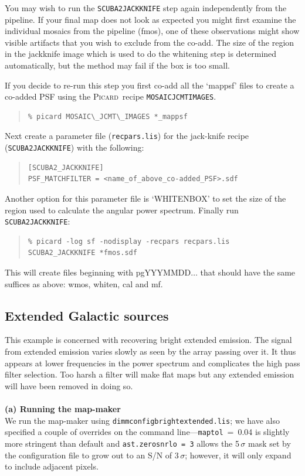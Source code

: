 \documentclass[twoside,11pt]{article}
\newcommand{\xref}[3]{#1}
\newcommand{\xlabel}[1]{}
\renewcommand{\_}{\texttt{\symbol{95}}}
\newenvironment{myquote}{\begin{quote}\begin{small}}{\end{small}\end{quote}}
\newcommand{\picard}{\xref{\textsc{Picard}}{sun265}{}}
\newcommand{\drrecipe}[1]{\texttt{#1}}
\begin{document}
You may wish to run the \drrecipe{SCUBA2\_JACKKNIFE} step again
independently from the pipeline. If your final map does not look as
expected you might first examine the individual mosaics from the
pipeline (\_fmos), one of these observations might show visible
artifacts that you wish to exclude from the co-add. The size of the
region in the jackknife image which is used to do the whitening step
is determined automatically, but the method may fail if the box is too
small.

If you decide to re-run this step you first co-add all the `\_mappsf'
files to create a co-added PSF using the \picard\ recipe
\xref{\drrecipe{MOSAIC\_JCMT\_IMAGES}}{sun265}{MOSAIC_JCMT_IMAGES}.
\begin{myquote}
\begin{verbatim}
% picard MOSAIC\_JCMT\_IMAGES *_mappsf
\end{verbatim}
\end{myquote}
Next create a parameter file (\texttt{recpars.lis}) for the jack-knife
recipe (\drrecipe{SCUBA2\_JACKKNIFE}) with the following:
\begin{myquote}
\begin{verbatim}
[SCUBA2_JACKKNIFE]
PSF_MATCHFILTER = <name_of_above_co-added_PSF>.sdf
\end{verbatim}
\end{myquote}
Another option for this parameter file is `WHITEN\_BOX' to set the
size of the region used to calculate the angular power spectrum.
Finally run \drrecipe{SCUBA2\_JACKKNIFE}:
\begin{myquote}
\begin{verbatim}
% picard -log sf -nodisplay -recpars recpars.lis SCUBA2_JACKKNIFE *fmos.sdf
\end{verbatim}
\end{myquote}
This will create files beginning with pgYYYMMDD$\ldots$ that should have
the same suffices as above: \_wmos, \_whiten, \_cal and \_mf.


\subsection{\xlabel{Galactic}Extended Galactic sources}
\label{sec:bright_ex}

This example is concerned with recovering bright extended emission.
The signal from extended emission varies slowly as seen by the array
passing over it. It thus appears at lower frequencies in the power
spectrum and complicates the high pass filter selection. Too harsh a
filter will make flat maps but any extended emission will have been
removed in doing so.
\\ \\
\textbf{(a) Running the map-maker}\\
We run the map-maker using \texttt{dimmconfig\_bright\_extended.lis};
we have also specified a couple of overrides on the command
line---\texttt{maptol}~=~0.04 is slightly more stringent than default and
\texttt{ast.zero\_snrlo~=~3} allows the 5\,$\sigma$ mask set by the
configuration file to grow out to an S/N of 3\,$\sigma$; however, it
will only expand to include adjacent pixels.
\end{document}

